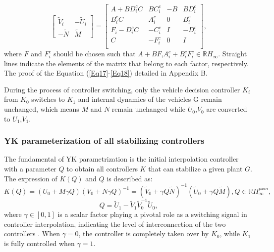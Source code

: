 \documentclass[a4paper,fleqn]{cas-sc}
\begin{document}
\begin{equation}
  \left[\begin{array}{cc}
      \tilde{V}_{i} & -\tilde{U}_{i} \\
      -\tilde{N}    & \tilde{M}
    \end{array}\right]=\left[\begin{array}{cc|cc}
      A+B  D_{i}^{c} C          & B  C_{i}^{c} & -B & B  D_{i}^{c} \\
      B_{i}^{c} C               & A_{i}^{c}    & 0  & B_{i}^{c}    \\
      \hline F_{i}- D_{i}^{c} C & -C_{i}^{c}   & I  & -D_{i}^{c}   \\
      C                         & -F_{i}^{c}   & 0  & I            \\
    \end{array}\right],
  \label{Eq18}
\end{equation}
where $F$ and $F_i^c$ should be chosen such that $A+BF$,$A_i^c+B_i^c F_i^c\in \mathbb{R} H_{\infty}$. Straight lines indicate the elements of the matrix that belong to each factor, respectively. The proof of the Equation (\ref{Eq17}-\ref{Eq18}) detailed in Appendix B.

During the process of controller switching, only the vehicle decision controller $K_i$ from $K_0$ switches to $K_1$ and internal dynamics of the vehicles G remain unchanged, which means $M$ and $N$ remain unchanged while $U_0$,$V_0$ are converted to $U_1$,$V_1$.

\subsubsection{YK parameterization of all stabilizing controllers}
\label{Section 3.2.3}

The fundamental of YK parametrization is the initial interpolation controller with a parameter $Q$ to obtain all controllers $K$ that can stabilize a given plant $G$. The expression of $K(Q)$ and $Q$ is described as:
\begin{equation}
  K(Q)=\left(U_{0}+M \gamma Q\right)\left(V_{0}+N \gamma Q\right)^{-1}=\left(\tilde{V}_{0}+\gamma Q \tilde{N}\right)^{-1}\left(\tilde{U}_{0}+\gamma Q \tilde{M}\right), Q \in \mathbb{R} H_{\infty}^{p x m},
\end{equation}
\begin{equation}
  Q=\tilde{U}_{1}-\tilde{V}_{1} \tilde{V}_{0}^{-1} \tilde{U}_{0},
  \label{Eq20}
\end{equation}
where $\gamma \in [0,1]$ is a scalar factor playing a pivotal role as a switching signal in controller interpolation, indicating the level of interconnection of the two controllers \citep{niemann1999architecture}. When $\gamma=0$, the controller is completely taken over by $K_0$, while $K_1$ is fully controlled when $\gamma=1$.
\end{document}
